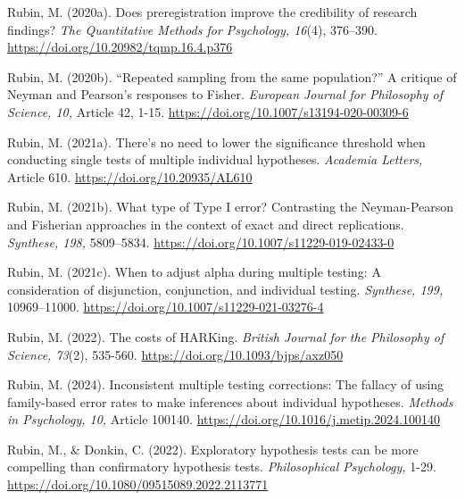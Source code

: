 \documentclass[authordate, empirical]{jote-new-article}
\begin{document}
	Rubin, M. (2020a). Does preregistration improve the credibility of research findings? \emph{The Quantitative Methods for Psychology, 16}(4), 376--390. \href{https://doi.org/10.20982/tqmp.16.4.p376}{https://doi.org/10.20982/tqmp.16.4.p376}



	Rubin, M. (2020b). “Repeated sampling from the same population?” A critique of Neyman and Pearson's responses to Fisher. \emph{European Journal for Philosophy of Science, 10,} Article 42, 1-15. \href{https://doi.org/10.1007/s13194-020-00309-6}{https://doi.org/10.1007/s13194-020-00309-6}



	Rubin, M. (2021a). There's no need to lower the significance threshold when conducting single tests of multiple individual hypotheses. \emph{Academia Letters,} Article 610. \href{https://doi.org/10.20935/AL610}{https://doi.org/10.20935/AL610}



	Rubin, M. (2021b). What type of Type I error? Contrasting the Neyman-Pearson and Fisherian approaches in the context of exact and direct replications. \emph{Synthese, 198,} 5809--5834. \href{https://doi.org/10.1007/s11229-019-02433-0}{https://doi.org/10.1007/s11229-019-02433-0}



	Rubin, M. (2021c). When to adjust alpha during multiple testing: A consideration of disjunction, conjunction, and individual testing. \emph{Synthese, 199,} 10969--11000. \href{https://doi.org/10.1007/s11229-021-03276-4}{https://doi.org/10.1007/s11229-021-03276-4}



	Rubin, M. (2022). The costs of HARKing. \emph{British Journal for the Philosophy of Science, 73}(2), 535-560.\emph{ }\href{https://doi.org/10.1093/bjps/axz050}{https://doi.org/10.1093/bjps/axz050}



	Rubin, M. (2024). Inconsistent multiple testing corrections: The fallacy of using family-based error rates to make inferences about individual hypotheses. \emph{Methods in Psychology, 10, }Article 100140. \href{https://doi.org/10.1016/j.metip.2024.100140}{https://doi.org/10.1016/j.metip.2024.100140}



	Rubin, M., \& Donkin, C. (2022). Exploratory hypothesis tests can be more compelling than confirmatory hypothesis tests. \emph{Philosophical Psychology, }1-29. \href{https://doi.org/10.1080/09515089.2022.2113771}{https://doi.org/10.1080/09515089.2022.2113771}
\end{document}
